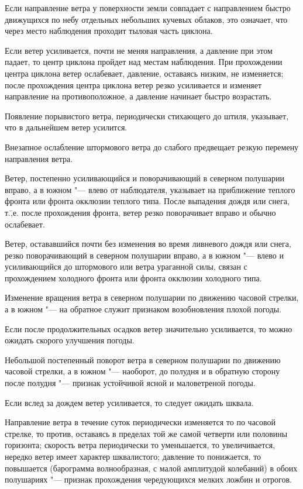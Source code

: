  Если направление ветра у поверхности земли совпадает с
направлением быстро движущихся по небу отдельных небольших кучевых
облаков, это означает, что через место наблюдения проходит тыловая
часть циклона.

 Если ветер усиливается, почти не меняя направления, а давление
при этом падает, то центр циклона пройдет над местам наблюдения. При
прохождении центра циклона ветер ослабевает, давление, оставаясь
низким, не изменяется; после прохождения центра циклона ветер резко
усиливается и изменяет направление на противоположное, а давление
начинает быстро возрастать.

 Появление порывистого ветра, периодически стихающего до штиля,
указывает, что в дальнейшем ветер усилится.

 Внезапное ослабление штормового ветра до слабого предвещает
резкую перемену направления ветра.

 Ветер, постепенно усиливающийся и поворачивающий в северном
полушарии вправо, а в южном "--- влево от наблюдателя, указывает на
приближение теплого фронта или фронта окклюзии теплого типа. После
выпадения дождя или снега, т.\=,е. после прохождения фронта, ветер
резко поворачивает вправо и обычно ослабевает.

 Ветер, остававшийся почти без изменения во время ливневого
дождя или снега, резко поворачивающий в северном полушарии вправо, а
в южном "--- влево и усиливающийся до штормового или ветра ураганной
силы, связан с прохождением холодного фронта или фронта окклюзии
холодного типа.

 Изменение вращения ветра в северном полушарии по движению
часовой стрелки, а в южном "--- на обратное служит признаком возобновления
плохой погоды.

 Если после продолжительных осадков ветер значительно
усиливается, то можно ожидать скорого улучшения погоды.

 Небольшой постепенный поворот ветра в северном полушарии по
движению часовой стрелки, а в южном "--- наоборот, до полудня и в обратную
сторону после полудня "--- признак устойчивой ясной и маловетреной погоды.

 Если вслед за дождем ветер усиливается, то следует ожидать шквала.

 Направление ветра в течение суток периодически изменяется то
по часовой стрелке, то против, оставаясь в пределах той же самой
четверти или половины горизонта; скорость ветра периодически то
уменьшается, то увеличивается, нередко ветер имеет характер
шквалистого; давление то понижается, то повышается (барограмма
волнообразная, с малой амплитудой колебаний) в обоих полушариях "---
признак прохождения чередующихся мелких ложбин и отрогов.

